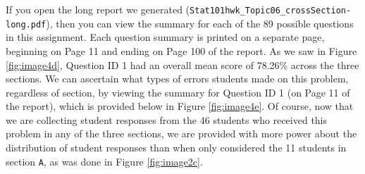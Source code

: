 \documentclass{article}\usepackage[]{graphicx}\usepackage[]{color}
\numberwithin{equation}{section} %
\begin{document}
If you open the long report we generated (\texttt{Stat101hwk\_Topic06\_crossSection-long.pdf}), then you can view the summary for each of the 89 possible questions in this assignment. Each question summary is printed on a separate page, beginning on Page 11 and ending on Page 100 of the report. As we saw in Figure \ref{fig:image4d}, Question ID 1 had an overall mean score of 78.26\% across the three sections. We can ascertain what types of errors students made on this problem, regardless of section, by viewing the summary for Question ID 1 (on Page 11 of the report), which is provided below in Figure \ref{fig:image4e}. Of course, now that we are collecting student responses from the 46 students who received this problem in any of the three sections, we are provided with more power about the distribution of student responses than when only considered the 11 students in section \texttt{A}, as was done in Figure \ref{fig:image2c}.

\begin{center}
\captionsetup{width=\textwidth}
\label{fig:image4e}
\end{center}
\end{document}
